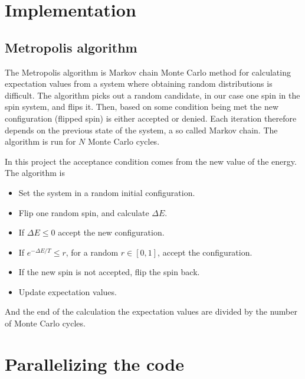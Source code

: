 \documentclass[11pt]{article}
\begin{document}
\section{Implementation}

\subsection{Metropolis algorithm} 

\begin{flushleft}
The Metropolis algorithm is Markov chain Monte Carlo method for calculating expectation values from a system where obtaining random distributions is difficult. The algorithm picks out a random candidate, in our case one spin in the spin system, and flips it. Then, based on some condition being met the new configuration (flipped spin) is either accepted or denied. Each iteration therefore depends on the previous state of the system, a so called Markov chain. The algorithm is run for $N$ Monte Carlo cycles.
\end{flushleft}

\begin{flushleft}
In this project the acceptance condition comes from the new value of the energy. The algorithm is 

\begin{itemize}
\item Set the system in a random initial configuration.

\item Flip one random spin, and calculate $\Delta E$.

\item If $\Delta E \leq 0$ accept the new configuration.

\item If $e^{-\Delta E/T} \leq r$, for a random $r \in [0,1]$, accept the configuration.

\item If the new spin is not accepted, flip the spin back.

\item Update expectation values.
\end{itemize}

And the end of the calculation the expectation values are divided by the number of Monte Carlo cycles.

\end{flushleft}

\section{Parallelizing the code}
\end{document}
